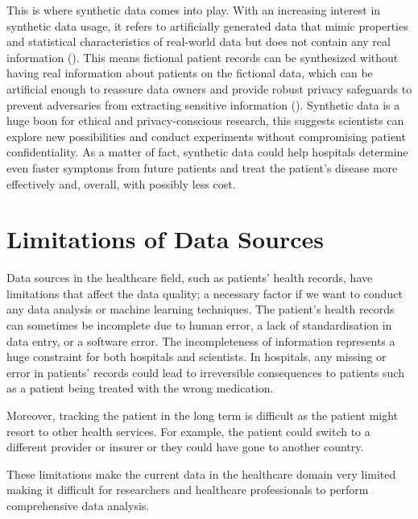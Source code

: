 \vspace{0.5cm}
This is where synthetic data comes into play. With an increasing interest in synthetic data usage, it refers to artificially generated data that mimic properties and statistical characteristics of real-world data but does not contain any real information (\cite{ElEmam2020}). This means fictional patient records can be synthesized without having real information about patients on the fictional data, which can be artificial enough to reassure data owners and provide robust privacy safeguards to prevent adversaries from extracting sensitive information (\cite{DataSynthesizer2017}). Synthetic data is a huge boon for ethical and privacy-conscious research, this suggests scientists can explore new possibilities and conduct experiments without compromising patient confidentiality. As a matter of fact, synthetic data could help hospitals determine even faster symptoms from future patients and treat the patient's disease more effectively and, overall, with possibly less cost.

\section{Limitations of Data Sources}
\label{sec:LimitationsTraditionalData}

Data sources in the healthcare field, such as patients' health records, have limitations that affect the data quality; a necessary factor if we want to conduct any data analysis or machine learning techniques. The patient's health records can sometimes be incomplete due to human error, a lack of standardisation in data entry, or a software error. The incompleteness of information represents a huge constraint for both hospitals and scientists. In hospitals, any missing or error in patients' records could lead to irreversible consequences to patients such as a patient being treated with the wrong medication.

\vspace{0.5cm}
Moreover, tracking the patient in the long term is difficult as the patient might resort to other health services. For example, the patient could switch to a different provider or insurer or they could have gone to another country.

\vspace{0.5cm}
These limitations make the current data in the healthcare domain very limited making it difficult for researchers and healthcare professionals to perform comprehensive data analysis.




